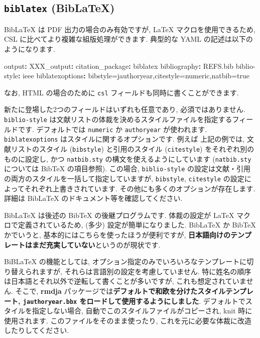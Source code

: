 \documentclass[
]{bxjsarticle}
\newenvironment{Shaded}{\begin{snugshade}}{\end{snugshade}}
\newcommand{\AttributeTok}[1]{\textcolor[rgb]{0.77,0.63,0.00}{#1}}
\newcommand{\FunctionTok}[1]{\textcolor[rgb]{0.00,0.00,0.00}{#1}}
\newcommand{\KeywordTok}[1]{\textcolor[rgb]{0.13,0.29,0.53}{\textbf{#1}}}
\begin{document}
\hypertarget{biblatex-biblatex}{%
\subsection{\texorpdfstring{\texttt{biblatex} (BibLaTeX)}{biblatex (BibLaTeX)}}\label{biblatex-biblatex}}

BibLaTeX は PDF 出力の場合のみ有効ですが, LaTeX マクロを使用できるため, CSL に比べてより複雑な組版処理ができます. 典型的な YAML の記述は以下のようになります.

\begin{Shaded}
\begin{Highlighting}[numbers=left,,]
\FunctionTok{output}\KeywordTok{:}
\AttributeTok{    }\FunctionTok{XXX\_output}\KeywordTok{:}
\AttributeTok{      }\FunctionTok{citation\_package}\KeywordTok{:}\AttributeTok{ biblatex}
\FunctionTok{bibliography}\KeywordTok{:}\AttributeTok{ REFS.bib}
\FunctionTok{biblio{-}style}\KeywordTok{:}\AttributeTok{ ieee}
\FunctionTok{biblatexoptions}\KeywordTok{:}\AttributeTok{ bibstyle=jauthoryear,citestyle=numeric,natbib=true}
\end{Highlighting}
\end{Shaded}

なお, HTML の場合のために \texttt{csl} フィールドも同時に書くことができます.

新たに登場した2つのフィールドはいずれも任意であり, 必須ではありません. \texttt{biblio-style} は文献リストの体裁を決めるスタイルファイルを指定するフィールドです. デフォルトでは \texttt{numeric} か \texttt{authoryear} が使われます. \texttt{biblatexoptions} はスタイルに関するオプションです. 例えば 上記の例では, 文献リストのスタイル (\texttt{bibstyle}) と引用のスタイル (\texttt{citestyle}) をそれぞれ別のものに設定し, かつ \texttt{natbib.sty} の構文を使えるようにしています (\texttt{natbib.sty} については BibTeX の項目参照). この場合, \texttt{biblio-style} の設定は文献・引用の両方のスタイルを一括して指定していますが, \texttt{bibstyle}, \texttt{citestyle} の設定によってそれぞれ上書きされています. その他にも多くのオプションが存在します. 詳細は BibLaTeX のドキュメント等を確認してください.

BibLaTeX は後述の BibTeX の後継プログラムです. 体裁の設定が LaTeX マクロで定義されているため, (多少) 設定が簡単になりました. BibLaTeX か BibTeX かでいうと, 基本的にはこちらを使ったほうが便利ですが, \textbf{日本語向けのテンプレートはまだ充実していない}というのが現状です.

BiBLaTeX の機能としては, オプション指定のみでいろいろなテンプレートに切り替えられますが, それらは言語別の設定を考慮していません. 特に姓名の順序は日本語とそれ以外で逆転して書くことが多いですが, これも想定されていません. そこで, \textbf{rmdja} パッケージでは\textbf{デフォルトで和欧を分けたスタイルテンプレート, \texttt{jauthoryear.bbx} をロードして使用するようにしました}. デフォルトでスタイルを指定しない場合, 自動でこのスタイルファイルがコピーされ, knit 時に使用されます. このファイルをそのまま使ったり, これを元に必要な体裁に改造したりしてください.
\end{document}
